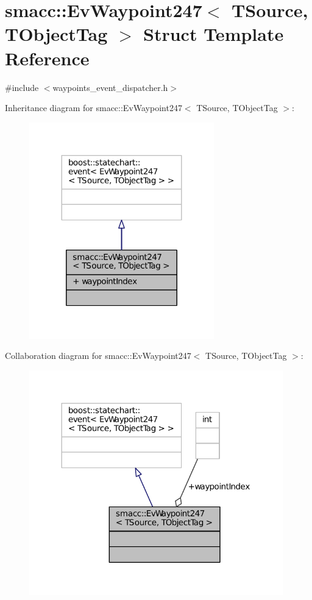 \hypertarget{structsmacc_1_1EvWaypoint247}{}\section{smacc\+:\+:Ev\+Waypoint247$<$ T\+Source, T\+Object\+Tag $>$ Struct Template Reference}
\label{structsmacc_1_1EvWaypoint247}


{\ttfamily \#include $<$waypoints\+\_\+event\+\_\+dispatcher.\+h$>$}



Inheritance diagram for smacc\+:\+:Ev\+Waypoint247$<$ T\+Source, T\+Object\+Tag $>$\+:
\nopagebreak
\begin{figure}[H]
\begin{center}
\leavevmode
\includegraphics[width=227pt]{structsmacc_1_1EvWaypoint247__inherit__graph}
\end{center}
\end{figure}


Collaboration diagram for smacc\+:\+:Ev\+Waypoint247$<$ T\+Source, T\+Object\+Tag $>$\+:
\nopagebreak
\begin{figure}[H]
\begin{center}
\leavevmode
\includegraphics[width=312pt]{structsmacc_1_1EvWaypoint247__coll__graph}
\end{center}
\end{figure}
